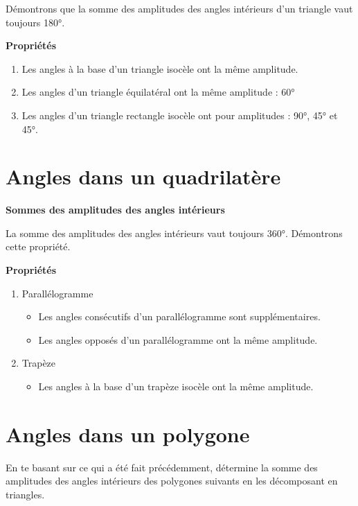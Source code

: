 \documentclass[../../syllabus_2.tex]{subfiles}
\begin{document}
Démontrons que la somme des amplitudes des angles intérieurs d'un triangle vaut toujours \ang{180}.
\vfill

\textbf{Propriétés}
\begin{enumerate}
    \item Les angles à la base d'un triangle isocèle ont la même amplitude.
    \item Les angles d'un triangle équilatéral ont la même amplitude : \ang{60}
    \item Les angles d'un triangle rectangle isocèle ont pour amplitudes : \ang{90}, \ang{45} et \ang{45}.
\end{enumerate}


\newpage
\section{Angles dans un quadrilatère}
\textbf{Sommes des amplitudes des angles intérieurs}

La somme des amplitudes des angles intérieurs vaut toujours \ang{360}. Démontrons cette propriété.
\vfill

\textbf{Propriétés}
\begin{enumerate}
    \item Parallélogramme
    \begin{itemize}
        \item Les angles consécutifs d'un parallélogramme sont supplémentaires.
        \item Les angles opposés d'un parallélogramme ont la même amplitude.
    \end{itemize}
    \item Trapèze
    \begin{itemize}
        \item Les angles à la base d'un trapèze isocèle ont la même amplitude. 
    \end{itemize}
\end{enumerate}
\newpage

\section{Angles dans un polygone}
En te basant sur ce qui a été fait précédemment, détermine la somme des amplitudes des angles intérieurs des polygones suivants en les décomposant en triangles.
\begin{center}
    
    \hfil
    
    \hfil
    
    \hfil
    
\end{center}
\end{document}
